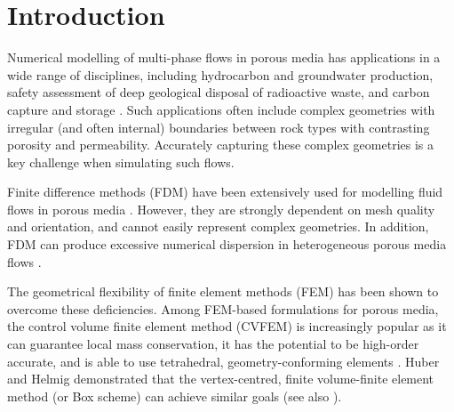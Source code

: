 \documentclass[times]{fldauth}
\begin{document}
\section{Introduction}

Numerical modelling of multi-phase flows in porous media has
applications in a wide range of disciplines, including hydrocarbon and
groundwater production, safety assessment of deep geological disposal
of radioactive waste, and carbon capture and storage \cite{chen_2006,
 aiea_1999,pruess_1990c,jiang_2011}. Such applications often
include complex geometries with irregular (and often internal)
boundaries between rock types with contrasting porosity and
permeability. Accurately capturing these complex geometries is a key
challenge when simulating such flows.

Finite difference methods (FDM) have been extensively used for
modelling fluid flows in porous media
\cite{aziz_1986, chen_1997, chen_2005}. However, they are strongly
dependent on mesh quality and orientation, and cannot easily represent
complex geometries. In addition, FDM can produce excessive numerical
dispersion in heterogeneous porous media flows \cite{chavent_1986}. 

The geometrical flexibility of finite element methods (FEM) has been
shown to overcome these deficiencies. Among FEM-based formulations for
porous media, the control volume finite element method (CVFEM) is
increasingly popular as it can guarantee local mass conservation, it
has the potential to be high-order accurate, and is able to use
tetrahedral, geometry-conforming elements \cite{forsyth_1990,
  cordazzo_2004, geiger_2004, hurtado_2007}. Huber and Helmig \cite{huber_2000}
demonstrated that the vertex-centred, finite volume-finite element
method (or Box scheme) can achieve similar goals (see also \cite{helmig_1997}).
\end{document}
